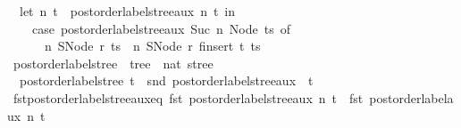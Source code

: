 \begin{isabellebody}
\ \ {\isacharparenleft}{\kern0pt}let\ {\isacharparenleft}{\kern0pt}n{\isacharprime}{\kern0pt}{\isacharcomma}{\kern0pt}\ t{\isacharprime}{\kern0pt}{\isacharparenright}{\kern0pt}\ {\isacharequal}{\kern0pt}\ postorder{\isacharunderscore}{\kern0pt}label{\isacharunderscore}{\kern0pt}stree{\isacharunderscore}{\kern0pt}aux\ n\ t\ in\isanewline
\ \ \ \ case\ postorder{\isacharunderscore}{\kern0pt}label{\isacharunderscore}{\kern0pt}stree{\isacharunderscore}{\kern0pt}aux\ {\isacharparenleft}{\kern0pt}Suc\ n{\isacharprime}{\kern0pt}{\isacharparenright}{\kern0pt}\ {\isacharparenleft}{\kern0pt}Node\ ts{\isacharparenright}{\kern0pt}\ of\isanewline
\ \ \ \ \ \ {\isacharparenleft}{\kern0pt}n{\isacharprime}{\kern0pt}{\isacharprime}{\kern0pt}{\isacharcomma}{\kern0pt}\ SNode\ r\ ts{\isacharprime}{\kern0pt}{\isacharparenright}{\kern0pt}\ {\isasymRightarrow}\ {\isacharparenleft}{\kern0pt}n{\isacharprime}{\kern0pt}{\isacharprime}{\kern0pt}{\isacharcomma}{\kern0pt}\ SNode\ r\ {\isacharparenleft}{\kern0pt}finsert\ t{\isacharprime}{\kern0pt}\ ts{\isacharprime}{\kern0pt}{\isacharparenright}{\kern0pt}{\isacharparenright}{\kern0pt}{\isacharparenright}{\kern0pt}{\isachardoublequoteclose}\isanewline
\isanewline
{}\isamarkupfalse%
\ postorder{\isacharunderscore}{\kern0pt}label{\isacharunderscore}{\kern0pt}stree\ {\isacharcolon}{\kern0pt}{\isacharcolon}{\kern0pt}\ {\isachardoublequoteopen}tree\ {\isasymRightarrow}\ nat\ stree{\isachardoublequoteclose}\ \isanewline
\ \ {\isachardoublequoteopen}postorder{\isacharunderscore}{\kern0pt}label{\isacharunderscore}{\kern0pt}stree\ t\ {\isacharequal}{\kern0pt}\ snd\ {\isacharparenleft}{\kern0pt}postorder{\isacharunderscore}{\kern0pt}label{\isacharunderscore}{\kern0pt}stree{\isacharunderscore}{\kern0pt}aux\ {}\ t{\isacharparenright}{\kern0pt}{\isachardoublequoteclose}\isanewline
\isanewline
{}\isamarkupfalse%
\ fst{\isacharunderscore}{\kern0pt}postorder{\isacharunderscore}{\kern0pt}label{\isacharunderscore}{\kern0pt}stree{\isacharunderscore}{\kern0pt}aux{\isacharunderscore}{\kern0pt}eq{\isacharcolon}{\kern0pt}\ {\isachardoublequoteopen}fst\ {\isacharparenleft}{\kern0pt}postorder{\isacharunderscore}{\kern0pt}label{\isacharunderscore}{\kern0pt}stree{\isacharunderscore}{\kern0pt}aux\ n\ t{\isacharparenright}{\kern0pt}\ {\isacharequal}{\kern0pt}\ fst\ {\isacharparenleft}{\kern0pt}postorder{\isacharunderscore}{\kern0pt}label{\isacharunderscore}{\kern0pt}aux\ n\ t{\isacharparenright}{\kern0pt}{\isachardoublequoteclose}\isanewline
%
\isadelimproof
\ \ %
\endisadelimproof
%
\isatagproof
{}\isamarkupfalse%

\end{isabellebody}

